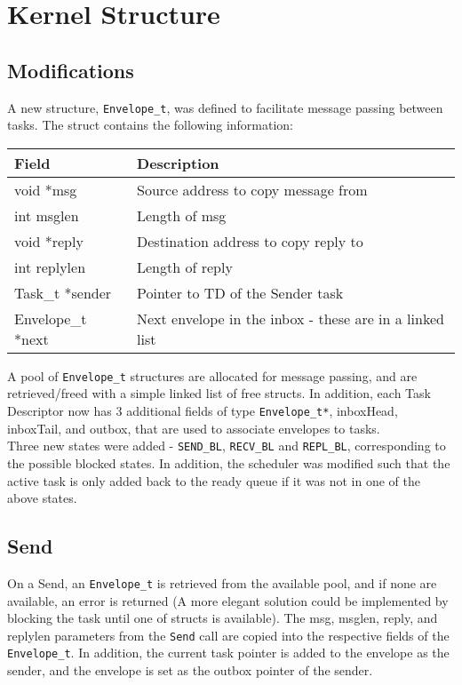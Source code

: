 \documentclass[12pt]{article}
\begin{document}
\section{Kernel Structure}
\subsection{Modifications}
A new structure, \texttt{Envelope\_t}, was defined to facilitate message passing between tasks. The struct contains the following information:
\begin{center}
  \begin{tabular}{|l|l|}
    \hline
    {\bf Field} & {\bf Description} \\\hline
    void *msg & Source address to copy message from \\\hline
    int msglen & Length of msg \\\hline
    void *reply & Destination address to copy reply to \\\hline
    int replylen & Length of reply \\\hline
    Task\_t *sender & Pointer to TD of the Sender task \\\hline
    Envelope\_t *next & Next envelope in the inbox - these are in a linked list \\\hline
  \end{tabular}
\end{center}
A pool of \texttt{Envelope\_t} structures are allocated for message passing, and are retrieved/freed with a simple linked list of free structs. In addition, each Task Descriptor now has 3 additional fields of type \texttt{Envelope\_t*}, inboxHead, inboxTail, and outbox, that are used to associate envelopes to tasks.
\\
Three new states were added - \texttt{SEND\_BL}, \texttt{RECV\_BL} and \texttt{REPL\_BL}, corresponding to the possible blocked states. In addition, the scheduler was modified such that the active task is only added back to the ready queue if it was not in one of the above states.

\subsection{Send}
On a Send, an \texttt{Envelope\_t} is retrieved from the available pool, and if none are available, an error is returned (A more elegant solution could be implemented by blocking the task until one of structs is available). The msg, msglen, reply, and replylen parameters from the \texttt{Send} call are copied into the respective fields of the \texttt{Envelope\_t}. In addition, the current task pointer is added to the envelope as the sender, and the envelope is set as the outbox pointer of the sender.
\end{document}
